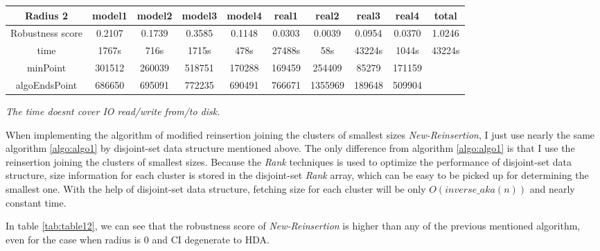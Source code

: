 \documentclass{article}
\begin{document}
\begin{table}[]
\begin{adjustwidth}{-1cm}{}
\begin{threeparttable}
\begin{tabular}{|c|c|c|c|c|c|c|c|c|c|}
				\textbf{Radius 2} & \textbf{model1} & \textbf{model2} & \textbf{model3} & \textbf{model4} & \textbf{real1} & \textbf{real2} & \textbf{real3} & \textbf{real4} & \textbf{total} \\ \hline
				Robustness score                 & 0.2107    & 0.1739    & 0.3585    & 0.1148    & 0.0303    & 0.0039    & 0.0954    & 0.0370    & 1.0246    \\ \hline
				
				time                             & 1767s     & 716s      & 1715s     & 478s      & 27488s    & 58s       & 43224s    & 1044s     & 43224s    \\ \hline
				
				minPoint                         & 301512          & 260039          & 518751          & 170288          & 169459         & 254409         & 85279          & 171159         &                \\ \hline
				algoEndsPoint                    & 686650          & 695091          & 772235          & 690491          & 766671         & 1355969        & 189648         & 509904         &                \\ \hline
				
			\end{tabular}
			\begin{tablenotes}
				\small
				\item\textit{ The time doesn\textquotesingle t cover IO read/write from/to disk.}
			\end{tablenotes}			
		\end{threeparttable}
	\end{adjustwidth}	
	\end{table}
	 
	 
	 When implementing the algorithm of modified reinsertion joining the clusters of smallest sizes \textit{New-Reinsertion}, I just use nearly the same algorithm \ref{algo:algo1} by disjoint-set data structure mentioned above. The only difference from algorithm \ref{algo:algo1} is that I use the reinsertion joining the clusters of smallest sizes. Because the \textit{Rank} techniques is used to optimize the performance of disjoint-set data structure, size information for each cluster is stored in the disjoint-set \textit{Rank} array, which can be easy to be picked up for determining the smallest one. With the help of disjoint-set data structure, fetching size for each cluster will be only $O(inverse\_aka(n))$ and nearly constant time.
	 
	 In table \ref{tab:table12}, we can see that the robustness score of \textit{New-Reinsertion} is higher than any of the previous mentioned algorithm, even for the case when radius is 0 and CI degenerate to HDA.
	 
\end{document}
